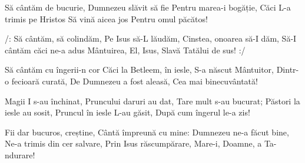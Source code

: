 \beginverse
Să cântăm de bucurie,
Dumnezeu slăvit să fie
Pentru marea-i bogăție,
Căci L-a trimis pe Hristos
Să vină aicea jos
Pentru omul păcătos!
\endverse

\beginchorus
/: Să cântăm, să colindăm,
Pe Isus să-L lăudăm,
Cinstea, onoarea să-I dăm,
Să-I cântăm căci ne-a adus
Mântuirea, El, Isus,
Slavă Tatălui de sus! :/
\endchorus

\beginverse
Să cântăm cu îngerii-n cor
Căci la Betleem, în iesle,
S-a născut Mântuitor,
Dintr-o fecioară curată,
De Dumnezeu a fost aleasă,
Cea mai binecuvântată!
\endverse

\beginverse
Magii I s-au închinat,
Pruncului daruri au dat,
Tare mult s-au bucurat;
Păstori la iesle au sosit,
Pruncul în iesle L-au găsit,
După cum îngerul le-a zis!
\endverse

\beginverse
Fii dar bucuros, creștine,
Cântă împreună cu mine:
Dumnezeu ne-a făcut bine,
Ne-a trimis din cer salvare,
Prin Isus răscumpărare,
Mare-i, Doamne, a Ta-ndurare!
\endverse
\endsong
